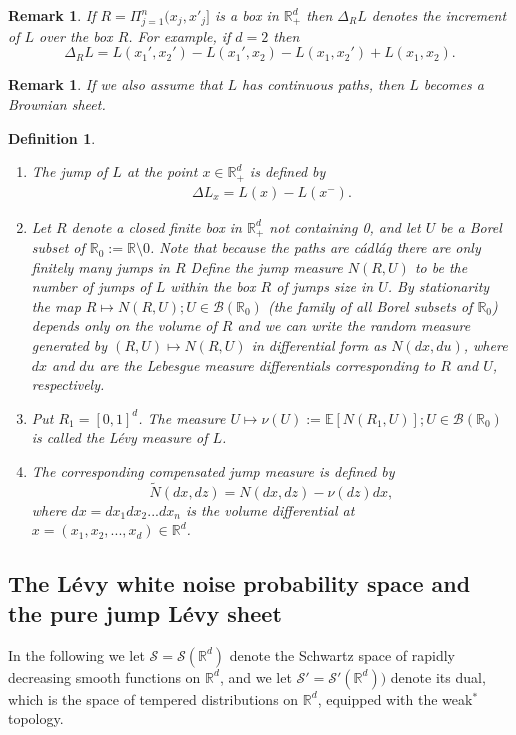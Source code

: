 \documentclass[12pt]{article}%
\newcommand{\E}{E}
\newtheorem{definition}[theorem]{Definition}
\newtheorem{remark}[theorem]{Remark}
\newenvironment{myenumerate}{\renewcommand{\theenumi}{\roman{enumi}}
\renewcommand{\labelenumi}{\bf (\theenumi)}
\begin{enumerate}}{\end{enumerate}}
\numberwithin{equation}{section}
\def\R{\mathbb{R}}
\def\S{\mathcal{S}}
\def\E{\mathbb{E}}
\begin{document}
\begin{remark}
If $R=\Pi_{j=1}^n (x_j,x'_j]$ is a box in $\R_+^d$ then $\Delta_R L$ denotes the increment of $L$ over the box $R$. For example, if $d=2$ then
$$\Delta_R L= L(x_1',x_2')-L(x_1',x_2) - L(x_1, x_2') + L(x_1,x_2).$$
\end{remark}
\begin{remark}    
If we also assume that $L$ has continuous paths, then $L$ becomes a \emph{Brownian sheet}.
\end{remark}


\begin{definition}
\begin{myenumerate}
    \item
    The jump of $L$ at the point $x \in \R_{+}^d$ is defined by
    \begin{align}
        \Delta L_x= L(x)-L(x^{-}).
    \end{align}
    \item
Let $R$ denote a closed finite box in $\R_+^d$ not containing 0, and let $U$ be a Borel subset of $\R_0:=\R \setminus 0$. Note that because the paths are c\'adl\'ag there are only finitely many jumps in $R$
Define \emph{the jump measure} $N(R,U)$ to be the number of jumps of $L$ within the box $R$ of jumps size in $U$. By stationarity the map $R \mapsto N(R,U);  U \in \mathcal{B}(\R_0)$ (the family of all Borel subsets of $\R_0$) depends only on the volume of $R$ and we can write the random measure generated by $(R,U) \mapsto N(R,U)$ in differential form as  $N(dx, du)$, where $dx$ and $du$ are the Lebesgue measure differentials corresponding to $R$ and $U$, respectively.
\item
Put $R_1=[0,1]^d$. The measure $U \mapsto \nu(U):=\E [N(R_1,U)];  U \in \mathcal{B}(\R_0)$ is called the L\'{e}vy measure of $L$.
\item
The corresponding \emph{compensated jump measure} is defined by
$$ \widetilde{N}(dx,dz)= N(dx,dz) - \nu(dz) dx,$$
where $dx=dx_1 dx_2 ... dx_n$ is the volume differential at $x=(x_1, x_2, ... ,x_d) \in \R^d$.
\end{myenumerate}
\end{definition}
\subsection{The L\'{e}vy white noise probability space and the pure jump L\'{e}vy sheet}

In the following we let $\S=\S(\R^d)$ denote the Schwartz space of rapidly decreasing smooth functions on $\R^d$, and we let $\S'=\S'(\R^d))$ denote its dual, which is the space of tempered distributions on $\R^d$, equipped with the weak$^{*}$ topology. 
\end{document}
